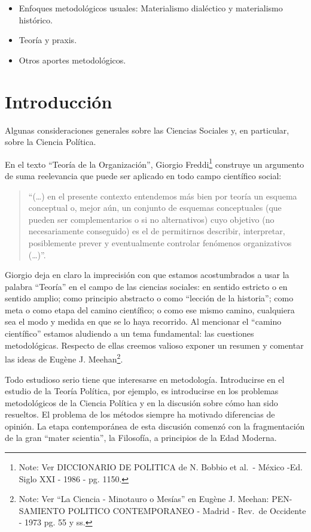 \documentclass[
]{book}
\providecommand{\tightlist}{%
  \setlength{\itemsep}{0pt}\setlength{\parskip}{0pt}}
\begin{document}
\begin{itemize}
  \begin{itemize}
  \tightlist
  \item
    Enfoques metodológicos usuales: Materialismo dialéctico y materialismo histórico.
  \item
    Teoría y praxis.
  \item
    Otros aportes metodológicos.
  \end{itemize}
\end{itemize}

\hypertarget{Introducciuxf3n}{%
\chapter{Introducción}\label{Introducciuxf3n}}

Algunas consideraciones generales sobre las Ciencias Sociales y, en particular, sobre la Ciencia Política.

En el texto ``Teoría de la Organización'', Giorgio Freddi\footnote{Note: Ver DICCIONARIO DE POLITICA de N. Bobbio et al.~- México -Ed. Siglo XXI - 1986 - pg. 1150.} construye un argumento de suma reelevancia que puede ser aplicado en todo campo científico social:

\begin{quote}
``(\ldots) en el presente contexto entendemos más bien por teoría un esquema conceptual o, mejor aún, un conjunto de esquemas conceptuales (que pueden ser complementarios o si no alternativos) cuyo objetivo (no necesariamente conseguido) es el de permitirnos describir, interpretar, posiblemente prever y eventualmente controlar fenómenos organizativos (\ldots)''.
\end{quote}

Giorgio deja en claro la imprecisión con que estamos acostumbrados a usar la palabra ``Teoría'' en el campo de las ciencias sociales: en sentido estricto o en sentido amplio; como principio abstracto o como ``lección de la historia''; como meta o como etapa del camino científico; o como ese mismo camino, cualquiera sea el modo y medida en que se lo haya recorrido. Al mencionar el ``camino científico'' estamos aludiendo a un tema fundamental: las cuestiones metodológicas. Respecto de ellas creemos valioso exponer un resumen y comentar las ideas de Eugène J. Meehan\footnote{Note: Ver ``La Ciencia - Minotauro o Mesías'' en Eugène J. Meehan: PEN- SAMIENTO POLITICO CONTEMPORANEO - Madrid - Rev.~de Occidente - 1973 pg. 55 y ss.}.

Todo estudioso serio tiene que interesarse en metodología. Introducirse en el estudio de la Teoría Política, por ejemplo, es introducirse en los problemas metodológicos de la Ciencia Política y en la discusión sobre cómo han sido resueltos. El problema de los métodos siempre ha motivado diferencias de opinión. La etapa contemporánea de esta discusión comenzó con la fragmentación de la gran ``mater scientia'', la Filosofía, a principios de la Edad Moderna.
\end{document}
